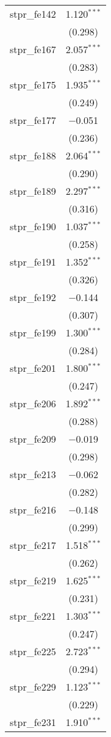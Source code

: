 \begin{table}[!htbp]
\begin{tabular}{@{\extracolsep{5pt}}lc}
  stpr\_fe142 & 1.120$^{***}$ \\ 
  & (0.298) \\ 
  stpr\_fe167 & 2.057$^{***}$ \\ 
  & (0.283) \\ 
  stpr\_fe175 & 1.935$^{***}$ \\ 
  & (0.249) \\ 
  stpr\_fe177 & $-$0.051 \\ 
  & (0.236) \\ 
  stpr\_fe188 & 2.064$^{***}$ \\ 
  & (0.290) \\ 
  stpr\_fe189 & 2.297$^{***}$ \\ 
  & (0.316) \\ 
  stpr\_fe190 & 1.037$^{***}$ \\ 
  & (0.258) \\ 
  stpr\_fe191 & 1.352$^{***}$ \\ 
  & (0.326) \\ 
  stpr\_fe192 & $-$0.144 \\ 
  & (0.307) \\ 
  stpr\_fe199 & 1.300$^{***}$ \\ 
  & (0.284) \\ 
  stpr\_fe201 & 1.800$^{***}$ \\ 
  & (0.247) \\ 
  stpr\_fe206 & 1.892$^{***}$ \\ 
  & (0.288) \\ 
  stpr\_fe209 & $-$0.019 \\ 
  & (0.298) \\ 
  stpr\_fe213 & $-$0.062 \\ 
  & (0.282) \\ 
  stpr\_fe216 & $-$0.148 \\ 
  & (0.299) \\ 
  stpr\_fe217 & 1.518$^{***}$ \\ 
  & (0.262) \\ 
  stpr\_fe219 & 1.625$^{***}$ \\ 
  & (0.231) \\ 
  stpr\_fe221 & 1.303$^{***}$ \\ 
  & (0.247) \\ 
  stpr\_fe225 & 2.723$^{***}$ \\ 
  & (0.294) \\ 
  stpr\_fe229 & 1.123$^{***}$ \\ 
  & (0.229) \\ 
  stpr\_fe231 & 1.910$^{***}$ \\ 

\end{tabular}
\end{table}
